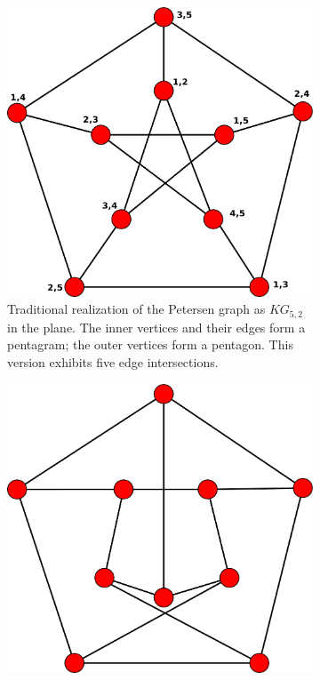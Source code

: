 \documentclass[11pt,            %
               a4paper,         %
               oneside,         %
               DIV12,           %
               fleqn,           %
               halfparskip,     %
               nochapterprefix, %
              ]{scrartcl} %
\theoremstyle{definition}
\begin{document}
\begin{figure}[p]
  \begin{subfigure}[t]{.45\textwidth}
    \centering
    \includegraphics[keepaspectratio=true,width=\textwidth]{../planar-graphs/petersen-grundlage.pdf}
    \caption{Traditional realization of the Petersen graph as
    $KG_{5,2}$ in the plane. The inner vertices and their edges form a
    pentagram; the outer vertices form a pentagon. This version
    exhibits five edge intersections.}
    \label{fig:petersen}
  \end{subfigure}\hfill
  \begin{subfigure}[t]{.45\textwidth}
    \centering
    \includegraphics[keepaspectratio=true,width=\textwidth]{../planar-graphs/petersen-zweikreuzungen.pdf}

\end{subfigure}
\end{figure}
\end{document}
